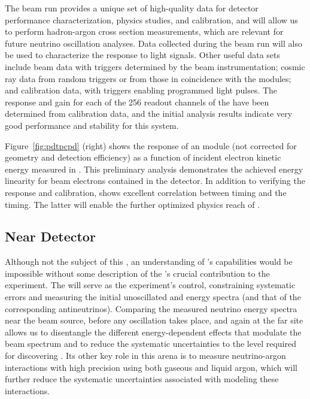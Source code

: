   The  beam run provides a unique set of high-quality data for detector performance characterization, physics studies, and calibration, and will 
allow us to perform hadron-argon cross section measurements, which are relevant for future  neutrino oscillation analyses.
Data collected during the beam run will also be used to characterize the  response to light signals. Other useful data sets include
beam data with triggers determined by the beam instrumentation; cosmic ray data  from random triggers or from those in coincidence with the  modules; and calibration data, with triggers enabling programmed light pulses. 
The %
response and gain for each of the 256 readout channels of the  have been determined from calibration data, and 
the initial analysis results indicate very good performance and stability for this system. 

Figure~\ref{fig:pdtpcpd} (right) shows the response of an %
  module (not corrected for geometry and detection efficiency) as a function of incident electron kinetic energy measured in . 
 This preliminary analysis demonstrates the achieved energy linearity for beam electrons contained in the detector.  
In addition to verifying the  response and calibration,  shows excellent correlation between  timing and the  timing. The latter will enable the further optimized physics reach of . 

\subsection{Near Detector}
\label{sec:nd-verview}

Although not the subject of this , an understanding of 's capabilities would be impossible without 
some description of the  's crucial contribution  to the experiment.
The  will serve as the experiment's control,
 constraining systematic errors and measuring the initial unoscillated \numu and \nue energy spectra (and that of the corresponding antineutrinos). 
Comparing the measured neutrino energy spectra near the beam source, before any oscillation takes place, and again at the far site allows us to disentangle the different energy-dependent effects that modulate the beam spectrum and to reduce the systematic uncertainties to the level required for discovering . Its other key role in this arena is to measure neutrino-argon interactions with high precision using both gaseous and liquid argon, which will further reduce the systematic uncertainties associated with modeling these interactions. 


